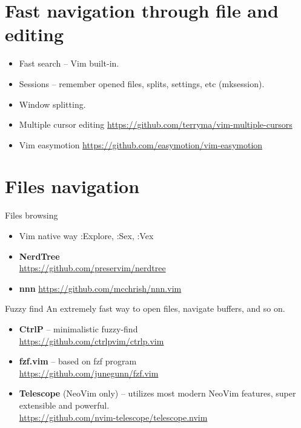 \documentclass[aspectratio=169]{beamer}
\newcommand{\myurl}[1]{{\color{indigo}\url{#1}}}%
\begin{document}
\section*{Fast navigation through file and editing}
\begin{frame}{\secname}
  \begin{itemize}
    \item Fast search -- Vim built-in. 
    \item Sessions -- remember opened files, splits, settings, etc (mksession).
    \item Window splitting. 
    \item Multiple cursor editing \myurl{https://github.com/terryma/vim-multiple-cursors}
    \item Vim easymotion \myurl{https://github.com/easymotion/vim-easymotion}
  \end{itemize}
  	
\end{frame}

\section*{Files navigation}
\begin{frame}{\secname}

  \begin{block}{Files browsing}
    \begin{itemize}
      \item {Vim native way :Explore, :Sex, :Vex}
      \item {\bf NerdTree}\\ \myurl{https://github.com/preservim/nerdtree}
      \item \textbf{nnn} \myurl{https://github.com/mcchrish/nnn.vim}
    \end{itemize}
  \end{block}

  \begin{block}{Fuzzy find }
    An extremely fast way to open files, navigate buffers, and so on.
    \begin{itemize}
      \item {\bf CtrlP} -- minimalistic fuzzy-find
        \\ \myurl{https://github.com/ctrlpvim/ctrlp.vim} 
      \item {\bf fzf.vim} -- based on fzf program
        \\ \myurl{https://github.com/junegunn/fzf.vim} 
      \item {\bf Telescope} (NeoVim only) -- utilizes most modern NeoVim features, super extensible and powerful.
        \\ \myurl{https://github.com/nvim-telescope/telescope.nvim} 
    \end{itemize}
  \end{block}
    
\end{frame}
\end{document}

